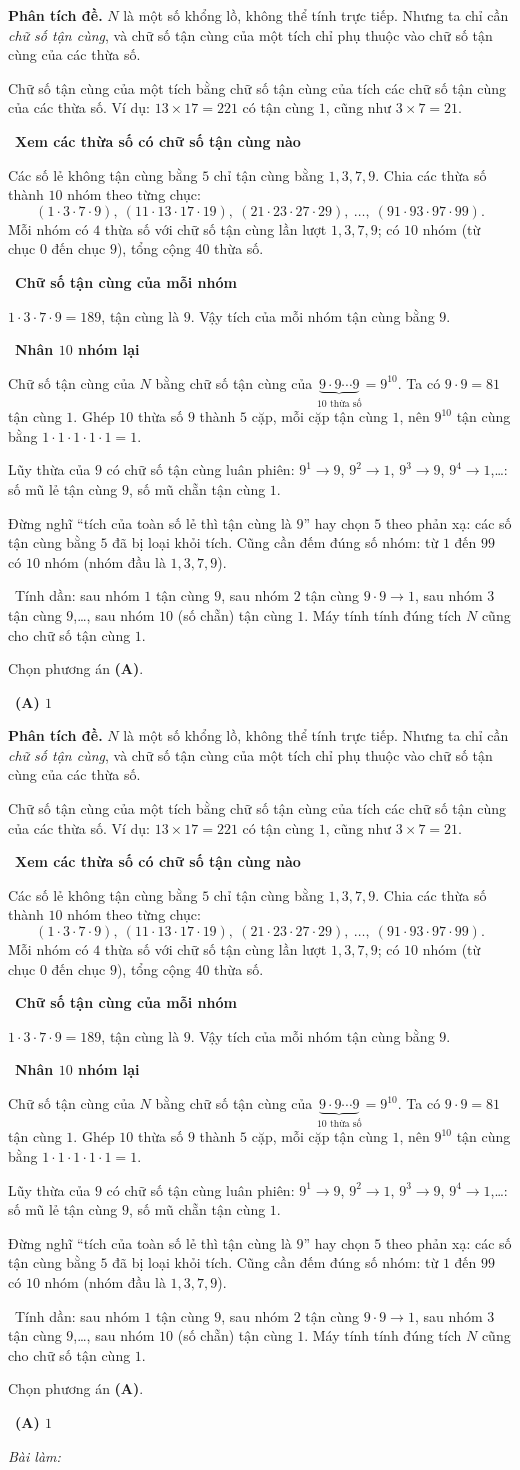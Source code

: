 \documentclass[11pt]{article}
\newif\ifsol \soltrue
\providecommand{\AnsWord}{Đáp số}
\newcommand{\StuProb}[2]{\begin{probboxS}{#1}{#2}\StuProbBody\end{probboxS}}
\newcommand{\ans}[1]{\par\smallskip{\bfseries\color{tmGreen!88!black}\AnsWord:}\ {\bfseries\color{AnsRed}#1}\par}
\newcommand{\probsol}[1]{%
  \begin{lrbox}{\solmeasure}\begin{minipage}{\dimexpr\linewidth-24pt\relax}#1\end{minipage}\end{lrbox}%
  \ifsol
    \begin{solbox}#1\end{solbox}%
  \else
    \setlength{\solht}{\dimexpr\ht\solmeasure+\dp\solmeasure+0.85cm\relax}%
    \ifdim\solht<1.35cm\setlength{\solht}{1.35cm}\fi
    \ifdim\solht>\StudentMaxWork\setlength{\solht}{\StudentMaxWork}\fi
    \par\noindent\begin{minipage}{\linewidth}%
    \expandafter\StuProb\StuProbArgs
    \begin{tcolorbox}[colback=white,colframe=Line,boxrule=0.8pt,arc=5pt,
      left=8pt,right=8pt,top=4pt,bottom=4pt,height=\solht]{\footnotesize\color{Slate}\itshape\WorkWord}\end{tcolorbox}%
    \end{minipage}\par\medskip
  \fi}
\newlength{\StudentMaxWork}\setlength{\StudentMaxWork}{4.5cm}
\newcommand{\step}[2]{\par\smallskip\noindent{\bfseries\color{tmBlue!85!black}\StepWord~#1.}\ {\bfseries #2}\par\nopagebreak}
\newcommand{\verify}[1]{\par\smallskip\noindent{\bfseries\color{tmGreen!80!black}\faCheckCircle\ \CheckWord}\ #1\par}
\def\WorkWord{Bài làm:}
\def\AnsWord{Đáp số}
\def\StepWord{Bước}
\def\CheckWord{Thử lại:}
\begin{document}
\probsol{
\textbf{Phân tích đề.} $N$ là một số khổng lồ, không thể tính trực tiếp. Nhưng ta chỉ cần \emph{chữ số tận cùng}, và chữ số tận cùng của một tích chỉ phụ thuộc vào chữ số tận cùng của các thừa số.

\begin{recallbox}Chữ số tận cùng của một tích bằng chữ số tận cùng của tích các chữ số tận cùng của các thừa số. Ví dụ: $13\times 17=221$ có tận cùng $1$, cũng như $3\times 7=21$.\end{recallbox}

\step{1}{Xem các thừa số có chữ số tận cùng nào}
Các số lẻ không tận cùng bằng $5$ chỉ tận cùng bằng $1,3,7,9$. Chia các thừa số thành $10$ nhóm theo từng chục:
\[(1\cdot3\cdot7\cdot9),\ (11\cdot13\cdot17\cdot19),\ (21\cdot23\cdot27\cdot29),\ \dots,\ (91\cdot93\cdot97\cdot99).\]
Mỗi nhóm có $4$ thừa số với chữ số tận cùng lần lượt $1,3,7,9$; có $10$ nhóm (từ chục $0$ đến chục $9$), tổng cộng $40$ thừa số.

\step{2}{Chữ số tận cùng của mỗi nhóm}
$1\cdot3\cdot7\cdot9=189$, tận cùng là $9$. Vậy tích của mỗi nhóm tận cùng bằng $9$.

\step{3}{Nhân $10$ nhóm lại}
Chữ số tận cùng của $N$ bằng chữ số tận cùng của $\underbrace{9\cdot 9\cdots 9}_{10\text{ thừa số}}=9^{10}$. Ta có $9\cdot 9=81$ tận cùng $1$. Ghép $10$ thừa số $9$ thành $5$ cặp, mỗi cặp tận cùng $1$, nên $9^{10}$ tận cùng bằng $1\cdot1\cdot1\cdot1\cdot1=1$.

\begin{tipbox}Lũy thừa của $9$ có chữ số tận cùng luân phiên: $9^1\to 9$, $9^2\to 1$, $9^3\to 9$, $9^4\to 1$,\dots: số mũ lẻ tận cùng $9$, số mũ chẵn tận cùng $1$.\end{tipbox}

\begin{warnbox}Đừng nghĩ ``tích của toàn số lẻ thì tận cùng là $9$'' hay chọn $5$ theo phản xạ: các số tận cùng bằng $5$ đã bị loại khỏi tích. Cũng cần đếm đúng số nhóm: từ $1$ đến $99$ có $10$ nhóm (nhóm đầu là $1,3,7,9$).\end{warnbox}

\verify{Tính dần: sau nhóm $1$ tận cùng $9$, sau nhóm $2$ tận cùng $9\cdot9\to1$, sau nhóm $3$ tận cùng $9$,\dots, sau nhóm $10$ (số chẵn) tận cùng $1$. Máy tính tính đúng tích $N$ cũng cho chữ số tận cùng $1$.}
Chọn phương án \textbf{(A)}.
\ans{(A) $1$}
}
\end{document}
